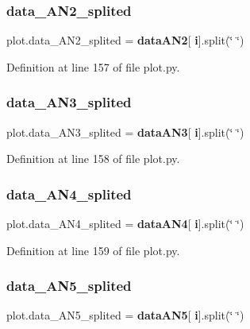 \subsubsection{data\+\_\+\+A\+N2\+\_\+splited}
{\footnotesize\ttfamily plot.\+data\+\_\+\+A\+N2\+\_\+splited = \textbf{ data\+A\+N2}[\textbf{ i}].split(\char`\"{} \char`\"{})}



Definition at line 157 of file plot.\+py.

\mbox{\label{namespaceplot_afe29fce661c1424561d970ddd1d390a7}} 
\subsubsection{data\+\_\+\+A\+N3\+\_\+splited}
{\footnotesize\ttfamily plot.\+data\+\_\+\+A\+N3\+\_\+splited = \textbf{ data\+A\+N3}[\textbf{ i}].split(\char`\"{} \char`\"{})}



Definition at line 158 of file plot.\+py.

\mbox{\label{namespaceplot_a5f6b73553a6e18ac0c8b112f65911410}} 
\subsubsection{data\+\_\+\+A\+N4\+\_\+splited}
{\footnotesize\ttfamily plot.\+data\+\_\+\+A\+N4\+\_\+splited = \textbf{ data\+A\+N4}[\textbf{ i}].split(\char`\"{} \char`\"{})}



Definition at line 159 of file plot.\+py.

\mbox{\label{namespaceplot_acb40850639a9e895d586b41c59b35d7c}} 
\subsubsection{data\+\_\+\+A\+N5\+\_\+splited}
{\footnotesize\ttfamily plot.\+data\+\_\+\+A\+N5\+\_\+splited = \textbf{ data\+A\+N5}[\textbf{ i}].split(\char`\"{} \char`\"{})}




